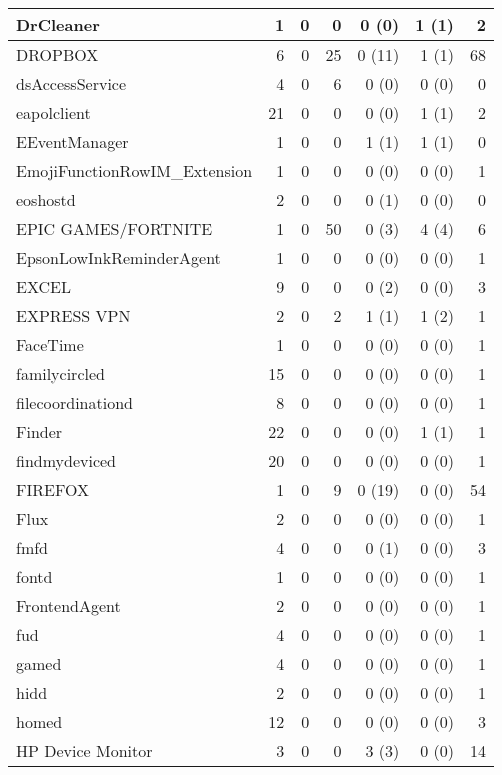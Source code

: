 \begin{adjustwidth}{-2in}{}
\begin{scriptsize}
\begin{longtable}[l]{ l | r | r | r | r | r | r }
    DrCleaner &  1 &  0 &  0 &  0 (0) &  1 (1) &  2 \\ \hline
    DROPBOX &  6 &  0 & 25 & 0 (11) &  1 (1) & 68 \\ \hline
    dsAccessService &  4 &  0 &  6 &  0 (0) &  0 (0) &  0 \\ \hline
    eapolclient & 21 &  0 &  0 &  0 (0) &  1 (1) &  2 \\ \hline
    EEventManager &  1 &  0 &  0 &  1 (1) &  1 (1) &  0 \\ \hline
    EmojiFunctionRowIM\_Extension & 1 &  0 &  0 &  0 (0) &  0 (0) &  1 \\ \hline
    eoshostd & 2 &  0 &  0 &  0 (1) &  0 (0) &  0 \\ \hline
    EPIC GAMES/FORTNITE &  1 &  0 & 50 &  0 (3) &  4 (4) &  6 \\ \hline
    EpsonLowInkReminderAgent & 1 &  0 &  0 &  0 (0) &  0 (0) &  1 \\ \hline
    EXCEL &  9 &  0 &  0 &  0 (2) &  0 (0) &  3 \\ \hline
    EXPRESS VPN &  2 &  0 &  2 &  1 (1) &  1 (2) &  1 \\ \hline
    FaceTime & 1 &  0 &  0 &  0 (0) &  0 (0) &  1 \\ \hline
    familycircled & 15 &  0 &  0 &  0 (0) &  0 (0) &  1 \\ \hline
    filecoordinationd &  8 &  0 &  0 &  0 (0) &  0 (0) &  1 \\ \hline
    Finder &  22 &  0 &  0 &  0 (0) &  1 (1) &  1 \\ \hline
    findmydeviced & 20 &  0 &  0 &  0 (0) &  0 (0) &  1 \\ \hline
    FIREFOX &  1 &  0 &  9 & 0 (19) &  0 (0) & 54 \\ \hline
    Flux & 2 &  0 &  0 &  0 (0) &  0 (0) &  1 \\ \hline
    fmfd & 4 &  0 &  0 &  0 (1) &  0 (0) &  3 \\ \hline
    fontd &  1 &  0 &  0 &  0 (0) &  0 (0) &  1 \\ \hline
    FrontendAgent &  2 &  0 &  0 &  0 (0) &  0 (0) &  1 \\ \hline
    fud &  4 &  0 &  0 &  0 (0) &  0 (0) &  1 \\ \hline
    gamed &  4 &  0 &  0 &  0 (0) &  0 (0) &  1 \\ \hline
    hidd & 2 &  0 &  0 &  0 (0) &  0 (0) &  1 \\ \hline
    homed & 12 &  0 &  0 &  0 (0) &  0 (0) &  3 \\ \hline
    HP Device Monitor &  3 &  0 &  0 &  3 (3) &  0 (0) & 14 \\ \hline

\end{longtable}
\end{scriptsize}
\end{adjustwidth}
